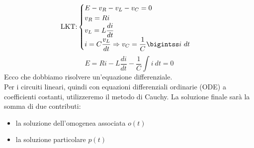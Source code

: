 \documentclass{article}
\begin{document}
\[
    \text{LKT:}
    \begin{cases}
        E-v_R-v_L-v_C=0\\
        v_R=R  i\\
        v_L = L \dfrac{di}{dt}\\
        i = C \dfrac{v_L}{dt} \Rightarrow v_C = \dfrac{1}{C} \bigintss i \ dt
    \end{cases}
\]
\[
    E = R  i - L \frac{di}{dt} - \frac{1}{C} \int i \ dt = 0    
\]
Ecco che dobbiamo risolvere un'equazione differenziale.
\vspace*{0.2cm}\\
Per i circuiti lineari, quindi con equazioni differenziali ordinarie (ODE) a coefficienti costanti, utilizzeremo il metodo di Cauchy. La soluzione finale sarà la somma di due contributi:
\begin{itemize}
    \item la soluzione dell'omogenea associata $o(t)$
    \item la soluzione particolare $p(t)$
\end{itemize}
\end{document}
